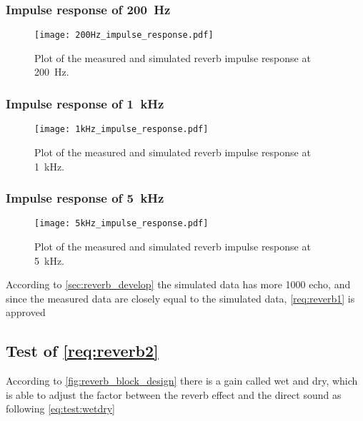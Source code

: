 \subsubsection*{Impulse response of \SI{200}{\hertz}}

\begin{figure}[htbp!]
    \centering
        \texttt{[image: 200Hz\_impulse\_response.pdf]}
        \caption{Plot of the measured and simulated \gls{reverb} impulse response at \SI{200}{\hertz}.}
        \label{fig:tests:reverb:200Hz}
  \end{figure}

  \newpage
\subsubsection*{Impulse response of \SI{1}{\kilo\hertz}}

\begin{figure}[htbp!]
    \centering
        \texttt{[image: 1kHz\_impulse\_response.pdf]}
        \caption{Plot of the measured and simulated \gls{reverb} impulse response at \SI{1}{\kilo\hertz}.}
        \label{fig:tests:reverb:1kHz}
  \end{figure}
  
  
 \subsubsection*{Impulse response of \SI{5}{\kilo\hertz}}

\begin{figure}[htbp!]
    \centering
        \texttt{[image: 5kHz\_impulse\_response.pdf]}
        \caption{Plot of the measured and simulated \gls{reverb} impulse response at \SI{5}{\kilo\hertz}.}
        \label{fig:tests:reverb:5kHz}
  \end{figure}
  
According to \autoref{sec:reverb_develop} the simulated data has more 1000 echo, and since the measured data are closely equal to the simulated data, \autoref{req:reverb1} is approved
  
  
\subsection{Test of \autoref{req:reverb2}}
According to \autoref{fig:reverb_block_design} there is a gain called wet and dry, which is able to adjust the factor between the \gls{reverb} effect and the direct sound as following \autoref{eq:test:wetdry}

